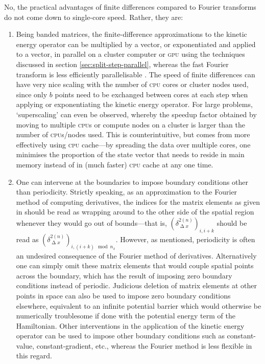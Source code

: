 No, the practical advantages of finite differences compared to Fourier transforms do not come down to single-core speed. Rather, they are:
\begin{enumerate}
    \item Being banded matrices, the finite-difference approximations to the kinetic energy operator can be multiplied by a vector, or exponentiated and applied to a vector, in parallel on a cluster computer or \textsc{gpu} using the techniques discussed in section \ref{sec:split-step-parallel}, whereas the fast Fourier transform is less efficiently parallelisable \cite{Gupta93thescalability}. The speed of finite differences can have very nice scaling with the number of \textsc{cpu} cores or cluster nodes used, since only $b$ points need to be exchanged between cores at each step when applying or exponentiating the kinetic energy operator. For large problems, `superscaling' can even be observed, whereby the speedup factor obtained by moving to multiple \textsc{cpu}s or compute nodes on a cluster is larger than the number of \textsc{cpu}s/nodes used. This is counterintuitive, but comes from more effectively using \textsc{cpu} cache---by spreading the data over multiple cores, one minimises the proportion of the state vector that needs to reside in main memory instead of in (much faster) \textsc{cpu} cache at any one time.
    \item One can intervene at the boundaries to impose boundary conditions other than periodicity. Strictly speaking, as an approximation to the Fourier method of computing derivatives, the indices for the matrix elements as given in  should be read as wrapping around to the other side of the spatial region whenever they would go out of bounds---that is, $(\delta^{2 (n)}_{\upDelta x})_{i, i + k}$ should be read as $(\delta^{2 (n)}_{\upDelta x})_{i, (i + k) \mod n_x}$. However, as mentioned, periodicity is often an undesired consequence of the Fourier method of derivatives. Alternatively one can simply omit these matrix elements that would couple spatial points across the boundary, which has the result of imposing zero boundary conditions instead of periodic. Judicious deletion of matrix elements at other points in space can also be used to impose zero boundary conditions elsewhere, equivalent to an infinite potential barrier which would otherwise be numerically troublesome if done with the potential energy term of the Hamiltonian. Other interventions in the application of the kinetic energy operator can be used to impose other boundary conditions such as constant-value, constant-gradient, etc., whereas the Fourier method is less flexible in this regard.

\end{enumerate}
